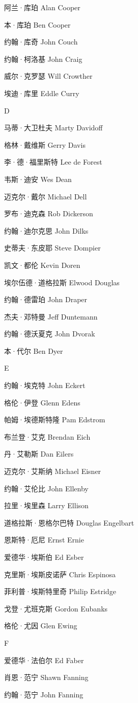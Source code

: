 \documentclass[12pt,UTF8]{ctexbook}
\begin{document}
阿兰·库珀 Alan Cooper

本·库珀 Ben Cooper

约翰·库奇 John Couch

约翰·柯洛基 John Craig

威尔·克罗瑟 Will Crowther

埃迪·库里 Eddle Curry

D

马蒂·大卫杜夫 Marty Davidoff

格林·戴维斯 Gerry Davis

李·德·福里斯特 Lee de Forest

韦斯·迪安 Wes Dean

迈克尔·戴尔 Michael Dell

罗布·迪克森 Rob Dickerson

约翰·迪尔克思 John Dilks

史蒂夫·东皮耶 Steve Dompier

凯文·都伦 Kevin Doren

埃尔伍德·道格拉斯 Elwood Douglas

约翰·德雷珀 John Draper

杰夫·邓特曼 Jeff Duntemann

约翰·德沃夏克 John Dvorak

本·代尔 Ben Dyer

E

约翰·埃克特 John Eckert

格伦·伊登 Glenn Edens

帕姆·埃德斯特隆 Pam Edstrom

布兰登·艾克 Brendan Eich

丹·艾勒斯 Dan Eilers

迈克尔·艾斯纳 Michael Eisner

约翰·艾伦比 John Ellenby

拉里·埃里森 Larry Ellison

道格拉斯·恩格尔巴特 Douglas Engelbart

恩斯特·厄尼 Ernst Ernie

爱德华·埃斯伯 Ed Esber

克里斯·埃斯皮诺萨 Chris Espinosa

菲利普·埃斯特里奇 Philip Estridge

戈登·尤班克斯 Gordon Eubanks

格伦·尤因 Glen Ewing

F

爱德华·法伯尔 Ed Faber

肖恩·范宁 Shawn Fanning

约翰·范宁 John Fanning
\end{document}
